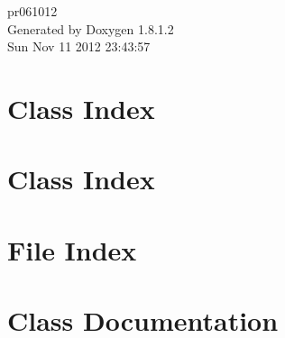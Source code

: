 \documentclass{book}
\begin{document}
\hypersetup{pageanchor=false,citecolor=blue}
\begin{titlepage}
\vspace*{7cm}
\begin{center}
{\Large pr061012 }\\
\vspace*{1cm}
{\large Generated by Doxygen 1.8.1.2}\\
\vspace*{0.5cm}
{\small Sun Nov 11 2012 23:43:57}\\
\end{center}
\end{titlepage}
\clearemptydoublepage
{}
\tableofcontents
\clearemptydoublepage
{}
\hypersetup{pageanchor=true,citecolor=blue}
\chapter{Class Index}

\chapter{Class Index}

\chapter{File Index}

\chapter{Class Documentation}

































\end{document}
